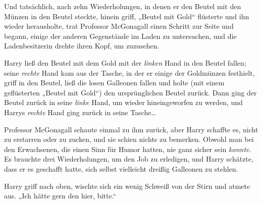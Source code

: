 Und tatsächlich, nach zehn Wiederholungen, in denen er den Beutel mit den Münzen in den Beutel steckte, hinein griff, „Beutel mit Gold“ flüsterte und ihn wieder herausholte, trat Professor McGonagall einen Schritt zur Seite und begann, einige der anderen Gegenstände im Laden zu untersuchen, und die Ladenbesitzerin drehte ihren Kopf, um zuzusehen.

Harry ließ den Beutel mit dem Gold mit der \emph{linken} Hand in den Beutel fallen; seine \emph{rechte} Hand kam aus der Tasche, in der er einige der Goldmünzen festhielt, griff in den Beutel, ließ die losen Galleonen fallen und holte (mit einem geflüsterten „Beutel mit Gold“) den ursprünglichen Beutel zurück. Dann ging der Beutel zurück in seine \emph{linke} Hand, um wieder hineingeworfen zu werden, und Harrys \emph{rechte} Hand ging zurück in seine Tasche…

Professor McGonagall schaute einmal zu ihm zurück, aber Harry schaffte es, nicht zu erstarren oder zu zucken, und sie schien nichts zu bemerken. Obwohl man bei den Erwachsenen, die einen Sinn für Humor hatten, nie ganz sicher sein \emph{konnte}. Es brauchte drei Wiederholungen, um den Job zu erledigen, und Harry schätzte, dass er es geschafft hatte, sich selbst vielleicht dreißig Galleonen zu stehlen.

Harry griff nach oben, wischte sich ein wenig Schweiß von der Stirn und atmete aus. „Ich hätte gern den hier, bitte.“

